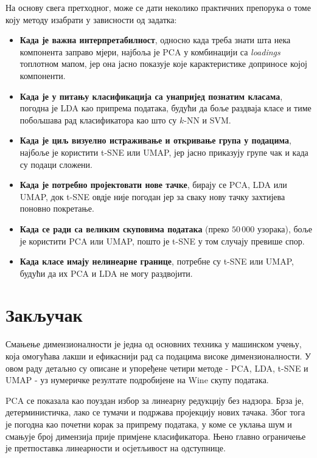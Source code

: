 \documentclass{article}
\begin{document}
	На основу свега претходног, може се дати неколико практичних препорука о томе коју методу изабрати у зависности од задатка:
	\begin{itemize}
		\item \textbf{Када је важна интерпретабилност}, односно када треба знати шта нека компонента заправо мјери, најбоља је PCA у комбинацији са \textit{loadings} топлотном мапом, јер она јасно показује које карактеристике доприносе којој компоненти.
		\item \textbf{Када је у питању класификација са унапријед познатим класама}, погодна је LDA као припрема података, будући да боље раздваја класе и тиме побољшава рад класификатора као што су $k$-NN и SVM.
		\item \textbf{Када је циљ визуелно истраживање и откривање група у подацима}, најбоље је користити t-SNE или UMAP, јер јасно приказују групе чак и када су подаци сложени.
		\item \textbf{Када је потребно пројектовати нове тачке}, бирају се PCA, LDA или UMAP, док t-SNE овдје није погодан јер за сваку нову тачку захтијева поновно покретање.
		\item \textbf{Када се ради са великим скуповима података} (преко $50\,000$ узорака), боље је користити PCA или UMAP, пошто је t-SNE у том случају превише спор.
		\item \textbf{Када класе имају нелинеарне границе}, потребне су t-SNE или UMAP, будући да их PCA и LDA не могу раздвојити.
	\end{itemize}
	
	\newpage
	
	
	\section{Закључак}
	
	Смањење димензионалности је једна од основних техника у машинском учењу, која омогућава лакши и ефикаснији рад са подацима високе димензионалности. У овом раду детаљно су описане и упоређене четири методе - PCA, LDA, t-SNE и UMAP - уз нумеричке резултате подробијене на Wine скупу података.
	
	PCA се показала као поуздан избор за линеарну редукцију без надзора. Брза је, детерминистичка, лако се тумачи и подржава пројекцију нових тачака. Због тога је погодна као почетни корак за припрему података, у коме се уклања шум и смањује број димензија прије примјене класификатора. Њено главно ограничење је претпоставка линеарности и осјетљивост на одступнице.
	
\end{document}
